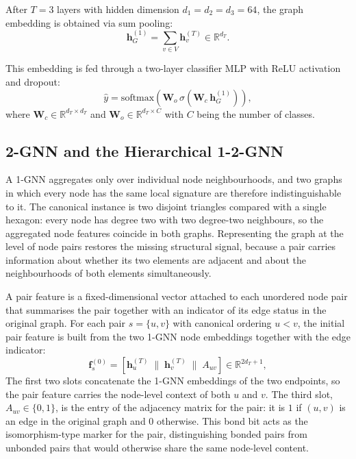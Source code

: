 \documentclass[12pt,a4paper]{article}
\begin{document}
After $T = 3$ layers with hidden dimension $d_1 = d_2 = d_3 = 64$, the graph embedding is obtained via sum pooling:
\begin{equation}
  \mathbf{h}_G^{(1)} = \sum_{v \in V} \mathbf{h}_v^{(T)} \in \mathbb{R}^{d_T}.
  \label{eq:1gnn-readout}
\end{equation}

This embedding is fed through a two-layer classifier MLP with ReLU activation and dropout:
\begin{equation}
  \hat{y} = \text{softmax}\!\left(\mathbf{W}_o\,\sigma(\mathbf{W}_c\,\mathbf{h}_G^{(1)})\right),
  \label{eq:classifier}
\end{equation}
where $\mathbf{W}_c \in \mathbb{R}^{d_T \times d_T}$ and $\mathbf{W}_o \in \mathbb{R}^{d_T \times C}$ with $C$ being the number of classes.

\subsection{2-GNN and the Hierarchical 1-2-GNN}
\label{sec:2gnn}

A 1-GNN aggregates only over individual node neighbourhoods, and two graphs in which every node has the same local signature are therefore indistinguishable to it. The canonical instance is two disjoint triangles compared with a single hexagon: every node has degree two with two degree-two neighbours, so the aggregated node features coincide in both graphs. Representing the graph at the level of node pairs restores the missing structural signal, because a pair carries information about whether its two elements are adjacent and about the neighbourhoods of both elements simultaneously.

A pair feature is a fixed-dimensional vector attached to each unordered node pair that summarises the pair together with an indicator of its edge status in the original graph. For each pair $s = \{u, v\}$ with canonical ordering $u < v$, the initial pair feature is built from the two 1-GNN node embeddings together with the edge indicator:
\begin{equation}
  \mathbf{f}_s^{(0)} = \left[\mathbf{h}_u^{(T)} \;\|\; \mathbf{h}_v^{(T)} \;\|\; A_{uv}\right] \in \mathbb{R}^{2d_T + 1},
  \label{eq:2set-feat}
\end{equation}
The first two slots concatenate the 1-GNN embeddings of the two endpoints, so the pair feature carries the node-level context of both $u$ and $v$. The third slot, $A_{uv} \in \{0,1\}$, is the entry of the adjacency matrix for the pair: it is $1$ if $(u,v)$ is an edge in the original graph and $0$ otherwise. This bond bit acts as the isomorphism-type marker for the pair, distinguishing bonded pairs from unbonded pairs that would otherwise share the same node-level content.
\end{document}
